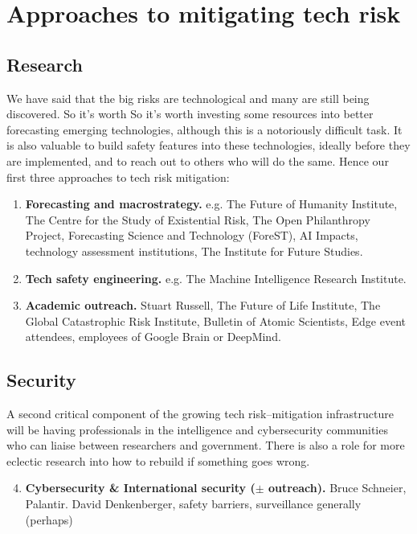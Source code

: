 ﻿\documentclass[12pt]{article}
\begin{document}
\section{Approaches to mitigating tech risk}
\subsection*{Research}
We have said that the big risks are technological and many are still being discovered. So it's worth
So it's worth investing some resources into better forecasting emerging technologies, although this 
is a notoriously difficult task. It is also valuable to build safety features into these technologies, 
ideally before they are implemented, and to reach out to others who will do the same. Hence our first 
three approaches to tech risk mitigation:

\begin{enumerate}[label=\textbf{\arabic*})]
    \item {\bfseries Forecasting and macrostrategy.} e.g. The Future of Humanity Institute, The Centre 
        for the Study of Existential Risk, The Open Philanthropy Project, Forecasting Science and 
        Technology (ForeST), AI Impacts, technology assessment institutions, The Institute for Future Studies.
    \item {\bfseries Tech safety engineering.} e.g. The Machine Intelligence Research Institute.
\item {\bfseries Academic outreach.} Stuart Russell, The Future of Life Institute, The Global Catastrophic 
    Risk Institute, Bulletin of Atomic Scientists, Edge event attendees, employees of Google Brain or DeepMind.
\end{enumerate}

\subsection*{Security}
A second critical component of the growing tech risk--mitigation infrastructure will be having professionals in the intelligence and cybersecurity communities who can liaise between researchers and government. There is also a role for more eclectic research into how to rebuild if something goes wrong.
\begin{enumerate}[label=\textbf{\arabic*})]
        \setcounter{enumi}{3}
    \item {\bfseries Cybersecurity \& International security (\(\mathbf{\pm}\) outreach).} Bruce Schneier, Palantir. David Denkenberger, safety barriers, surveillance generally (perhaps)
\end{enumerate}
\end{document}
